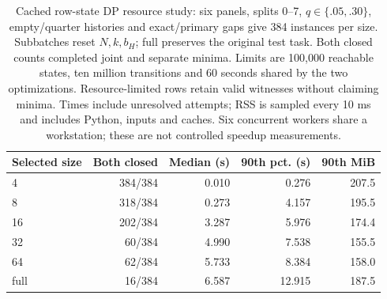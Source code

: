 \begin{table}[t]
\centering\small
\begin{tabular}{lrrrr}
\toprule
Selected size & Both closed & Median (s) & 90th pct. (s) & 90th MiB \\
\midrule
4 & 384/384 & 0.010 & 0.276 & 207.5 \\
8 & 318/384 & 0.273 & 4.157 & 195.5 \\
16 & 202/384 & 3.287 & 5.976 & 174.4 \\
32 & 60/384 & 4.990 & 7.538 & 155.5 \\
64 & 62/384 & 5.733 & 8.384 & 158.0 \\
full & 16/384 & 6.587 & 12.915 & 187.5 \\
\bottomrule
\end{tabular}
\caption{Cached row-state DP resource study: six panels, splits 0--7, $q\in\{.05,.30\}$, empty/quarter histories and exact/primary gaps give 384 instances per size. Subbatches reset $N,k,b_H$; full preserves the original test task. Both closed counts completed joint and separate minima. Limits are 100,000 reachable states, ten million transitions and 60 seconds shared by the two optimizations. Resource-limited rows retain valid witnesses without claiming minima. Times include unresolved attempts; RSS is sampled every 10 ms and includes Python, inputs and caches. Six concurrent workers share a workstation; these are not controlled speedup measurements.}
\label{tab:joint-dp-resources}
\end{table}
